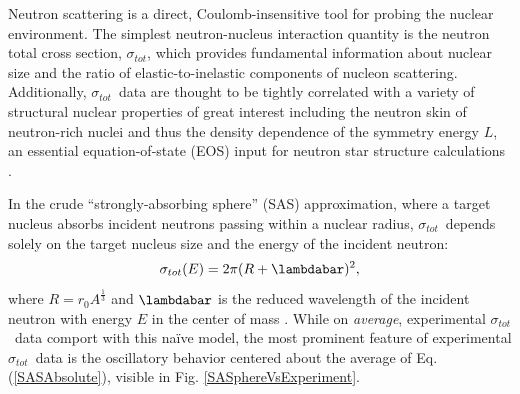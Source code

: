 \documentclass[twocolumn,secnumarabic,amssymb, nobibnotes, aps, prl,
superscriptaddress, nobalancelastpage, draft]{revtex4}
\newcommand{\tot}{\ensuremath{\sigma_{tot}}}
\newcommand{\totRD}{\ensuremath{\sigma_{A,A'}}(E)}
\begin{document}
Neutron scattering is a direct, Coulomb-insensitive tool for probing the nuclear
environment. The simplest neutron-nucleus interaction quantity is 
the neutron total cross section, \tot, which provides fundamental information about
nuclear size and the ratio of elastic-to-inelastic components of nucleon 
scattering. Additionally, \tot\ data are thought to be tightly correlated with
a variety of structural nuclear properties of great interest
including the neutron skin of neutron-rich nuclei
\cite{Mahzoon2017} and thus the density dependence of the symmetry energy $L$,
an essential equation-of-state (EOS) input for neutron star
structure calculations \cite{Fattoyev2012, Vinas2014, Brown2000}.

In the crude ``strongly-absorbing sphere'' (SAS) approximation, where a target
nucleus absorbs incident neutrons passing within a nuclear radius,
\tot\ depends solely on the target nucleus size and the energy of the incident neutron:
\begin{equation} \label{SASAbsolute}
    \sigma_{tot}(E) = 2\pi(R + \lambdabar)^{2},
\end{equation}
where $R=r_{0}A^{\frac{1}{3}}$ and $\lambdabar$ is the reduced wavelength
of the incident neutron with energy $E$ in the center of mass \cite{Fernbach1949, Satchler1980}. 
While on \textit{average}, experimental \tot\ data comport with this na\"ive
model, the most prominent feature of experimental \tot\ data is the oscillatory
behavior centered about the average of Eq. (\ref{SASAbsolute}), visible in Fig.
\ref{SASphereVsExperiment}.
\end{document}
